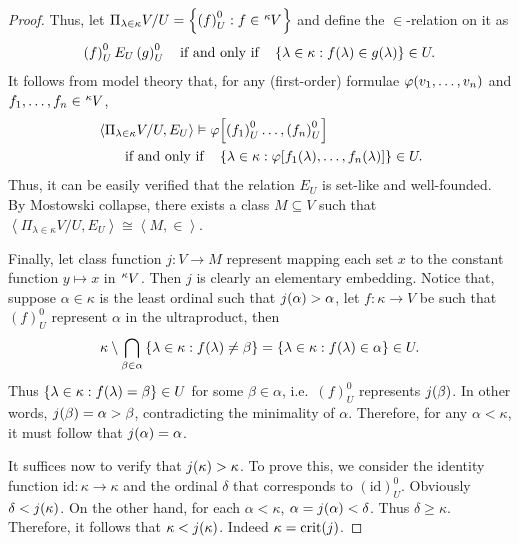 \documentclass[12pt]{article}
\theoremstyle{plain}
\theoremstyle{definition}
\DeclareMathOperator{\crit}{crit}
\begin{document}
\begin{proof}
	Thus, let $\Pi_{\lambda \in \kappa} V / U = \left\{\left(f\right)^0_U : f \in \tensor[^\kappa]{V}{}\right\}$ and define the $\in$-relation on it as
	\[\left(f\right)^0_U E_U \left(g\right)^0_U \quad \text{if and only if} \quad \left\{\lambda \in \kappa : f\mleft(\lambda\mright) \in g\mleft(\lambda\mright)\right\} \in U.\]
	It follows from model theory that, for any (first-order) formulae $\varphi\mleft(v_1,
		\ldots, v_n\mright)$ and $f_1, \ldots, f_n \in \tensor[^\kappa]{V}{}$,
	\begin{align*}
		 & \left\langle \Pi_{\lambda \in \kappa} V / U, E_U \right\rangle \vDash \varphi\mleft[\left(f_1\right)^0_U \ldots, \left(f_n\right)^0_U\mright]                    \\
		 & \qquad \text{if and only if} \quad \left\{\lambda \in \kappa : \varphi\mleft[f_1\mleft(\lambda\mright), \ldots, f_n\mleft(\lambda\mright)\mright]\right\} \in U.
	\end{align*}
	Thus, it can be easily verified that the relation $E_U$ is set-like and well-founded. By Mostowski collapse, there exists a class $M \subseteq V$ such that $\left\langle \Pi_{\lambda \in \kappa} V / U, E_U \right\rangle \cong \left\langle M, \in \right\rangle$.

	Finally, let class function $j : V \rightarrow M$ represent mapping each set $x$ to the constant function $y \mapsto x$ in $\tensor[^\kappa]{V}{}$. Then $j$ is clearly an elementary embedding. Notice that, suppose $\alpha \in \kappa$ is the least ordinal such that $j\mleft(\alpha\mright) > \alpha$, let $f : \kappa \rightarrow V$ be such that $\left(f\right)^0_U$ represent $\alpha$ in the ultraproduct, then
	\[\kappa \setminus \bigcap_{\beta \in \alpha} \left\{\lambda \in \kappa : f\mleft(\lambda\mright) \neq \beta\right\} = \left\{\lambda \in \kappa : f\mleft(\lambda\mright) \in \alpha\right\} \in U.\]
	Thus $\left\{\lambda \in \kappa : f\mleft(\lambda\mright) = \beta\right\} \in U$ for some $\beta \in \alpha$, i.e.\ $\left(f\right)^0_U$ represents $j\mleft(\beta\mright)$. In other words, $j\mleft(\beta\mright) = \alpha > \beta$, contradicting the minimality of $\alpha$. Therefore, for any $\alpha < \kappa$, it must follow that $j\mleft(\alpha\mright) = \alpha$.

	It suffices now to verify that $j\mleft(\kappa\mright) > \kappa$. To prove this, we consider the identity function $\mathrm{id} : \kappa \rightarrow \kappa$ and the ordinal $\delta$ that corresponds to $\left(\mathrm{id}\right)^0_U$. Obviously $\delta < j\mleft(\kappa\mright)$. On the other hand, for each $\alpha < \kappa$, $\alpha = j\mleft(\alpha\mright) < \delta$. Thus $\delta \geq \kappa$. Therefore, it follows that $\kappa < j\mleft(\kappa\mright)$. Indeed $\kappa = \crit\mleft(j\mright)$.
\end{proof}
\end{document}
